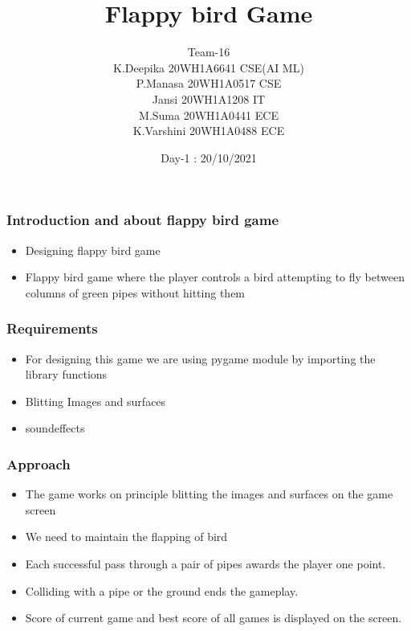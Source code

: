 \documentclass{beamer}
\title{Flappy bird Game}
\author{Team-16\\K.Deepika 20WH1A6641 CSE(AI ML)\\P.Manasa 20WH1A0517 CSE\\Jansi 20WH1A1208 IT\\M.Suma 20WH1A0441 ECE\\K.Varshini 20WH1A0488 ECE}
\date{Day-1 : 20/10/2021}
\begin{document}
    \begin{frame}
        \titlepage
    \end{frame}
    \begin{frame}
	\frametitle{Introduction and about flappy bird game}
        \begin{itemize}
            \item Designing flappy bird game
	    \item Flappy bird game where the player controls a bird attempting to fly between columns of green pipes without hitting them
	\end{itemize}
	    \end{frame}
	    \begin{frame}
		\frametitle{Requirements}
		\begin{itemize}
			\item For designing this game we are using pygame module by importing the library functions
			\item Blitting Images and surfaces
			\item soundeffects

	\end{itemize}
    \end{frame}
    \begin{frame}
        \frametitle{Approach}
	\begin{itemize}
	    \item The game works on principle blitting the images and surfaces on the game screen
\item We need to maintain the flapping of bird
\item Each successful pass through a pair of pipes awards the player one point.
\item Colliding with a pipe or the ground ends the gameplay.
\item Score of current game and best score of all games is displayed on the screen.
	\end{itemize}
    \end{frame}
\end{document}
